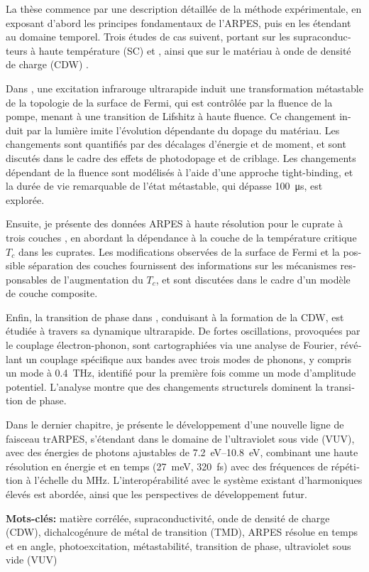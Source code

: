 \begin{otherlanguage}{french}
La thèse commence par une description détaillée de la méthode expérimentale, en exposant d'abord les principes fondamentaux de l'ARPES, puis en les étendant au domaine temporel. Trois études de cas suivent, portant sur les supraconducteurs à haute température (SC)  et , ainsi que sur le matériau à onde de densité de charge (CDW) .

Dans , une excitation infrarouge ultrarapide induit une transformation métastable de la topologie de la surface de Fermi, qui est contrôlée par la fluence de la pompe, menant à une transition de Lifshitz à haute fluence. Ce changement induit par la lumière imite l'évolution dépendante du dopage du matériau. Les changements sont quantifiés par des décalages d’énergie et de moment, et sont discutés dans le cadre des effets de photodopage et de criblage. Les changements dépendant de la fluence sont modélisés à l’aide d’une approche tight-binding, et la durée de vie remarquable de l’état métastable, qui dépasse \qty{100}{\micro\second}, est explorée.

Ensuite, je présente des données ARPES à haute résolution pour le cuprate à trois couches , en abordant la dépendance à la couche de la température critique $T_c$ dans les cuprates. Les modifications observées de la surface de Fermi et la possible séparation des couches fournissent des informations sur les mécanismes responsables de l’augmentation du $T_c$, et sont discutées dans le cadre d’un modèle de couche composite.

Enfin, la transition de phase dans , conduisant à la formation de la CDW, est étudiée à travers sa dynamique ultrarapide. De fortes oscillations, provoquées par le couplage électron-phonon, sont cartographiées via une analyse de Fourier, révélant un couplage spécifique aux bandes avec trois modes de phonons, y compris un mode à \qty{0.4}{\tera\hertz}, identifié pour la première fois comme un mode d’amplitude potentiel. L’analyse montre que des changements structurels dominent la transition de phase.

Dans le dernier chapitre, je présente le développement d’une nouvelle ligne de faisceau trARPES, s'étendant dans le domaine de l’ultraviolet sous vide (VUV), avec des énergies de photons ajustables de \qtyrange{7.2}{10.8}{\electronvolt}, combinant une haute résolution en énergie et en temps (\qty{27}{\milli\electronvolt}, \qty{320}{\femto\second}) avec des fréquences de répétition à l’échelle du \unit{\mega\hertz}. L’interopérabilité avec le système existant d’harmoniques élevés est abordée, ainsi que les perspectives de développement futur. \hfill\break

\textbf{Mots-clés:} matière corrélée, supraconductivité, onde de densité de charge (CDW), dichalcogénure de métal de transition (TMD), ARPES résolue en temps et en angle, photoexcitation, métastabilité, transition de phase, ultraviolet sous vide (VUV)
\end{otherlanguage}


